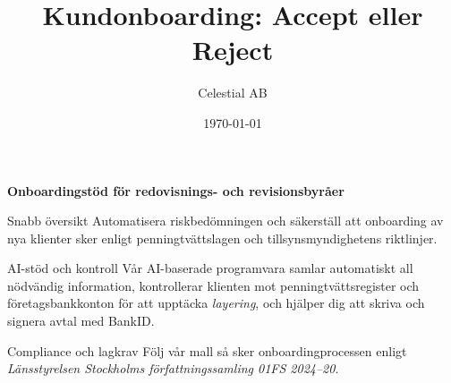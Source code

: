 \documentclass[10pt]{beamer}
\title[Kundonboarding]{Kundonboarding: Accept eller Reject}
\author[Celestial AB]{Celestial AB}
\institute{Risk \& Compliance}
\date{\today}
\begin{document}
\begin{frame}[plain]
  \begin{flushright}
    \vspace{-0.8cm}
    \hyperlink{login}{} \hspace{0.3cm}
    \hyperlink{register}{}
  \end{flushright}

  \vspace{1.2cm}
  \centering
  {\color{warmbrown}\textbf{Onboardingstöd för redovisnings- och revisionsbyråer}}

  \vspace{0.8cm}

  \begin{block}{Snabb översikt}
    Automatisera riskbedömningen och säkerställ att onboarding av nya klienter sker enligt penningtvättslagen och tillsynsmyndighetens riktlinjer.
  \end{block}

  \vspace{0.5cm}

  \begin{block}{AI-stöd och kontroll}
    Vår AI-baserade programvara samlar automatiskt all nödvändig information, kontrollerar klienten mot penningtvättsregister och företagsbankkonton för att upptäcka \textit{layering}, och hjälper dig att skriva och signera avtal med BankID.
  \end{block}

  \vspace{0.5cm}

  \begin{block}{Compliance och lagkrav}
    Följ vår mall så sker onboardingprocessen enligt \textit{Länsstyrelsen Stockholms författningssamling 01FS 2024–20}.
  \end{block}

  \vspace{0.5cm}


\end{frame}
\end{document}
